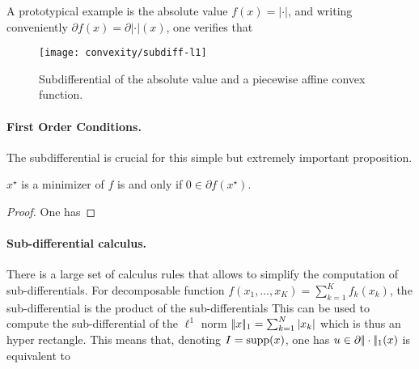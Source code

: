 A prototypical example is the absolute value $f(x)=|\cdot|$, and writing conveniently $\partial f(x) = \partial |\cdot|(x)$, one verifies that

\begin{figure}
\centering
\texttt{[image: convexity/subdiff-l1]}
\caption{\label{fig-subdiff-l1}
Subdifferential of the absolute value and a piecewise affine convex function.}
\end{figure}







\paragraph{First Order Conditions.}

The subdifferential is crucial for this simple but extremely important proposition.

\begin{prop}
	$x^\star$ is a minimizer of $f$ is and only if $0 \in \partial f(x^\star)$.
\end{prop}
\begin{proof}
	One has
\end{proof}

\paragraph{Sub-differential calculus.}

There is a large set of calculus rules that allows to simplify the computation of sub-differentials. For decomposable function $f(x_1,\ldots,x_K)=\sum_{k=1}^K f_k(x_k)$, the sub-differential is the product of the sub-differentials
This can be used to compute the sub-differential of the $\ell^1$ norm $|\!| x |\!|_1=\sum_{k=1}^N |x_k|$
which is thus an hyper rectangle. This means that, denoting $I = \operatorname{supp}(x)$, one has $u \in \partial |\!| \cdot |\!|_1(x)$ is equivalent to 

